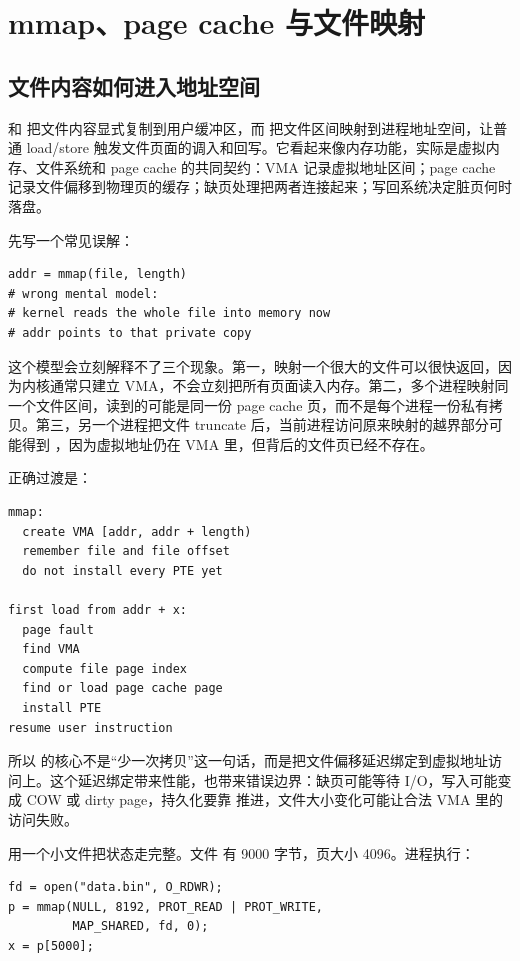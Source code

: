 \chapter{mmap、page cache 与文件映射}

\section{文件内容如何进入地址空间}

 和  把文件内容显式复制到用户缓冲区，而  把文件区间映射到进程地址空间，让普通 load/store 触发文件页面的调入和回写。它看起来像内存功能，实际是虚拟内存、文件系统和 page cache 的共同契约：VMA 记录虚拟地址区间；page cache 记录文件偏移到物理页的缓存；缺页处理把两者连接起来；写回系统决定脏页何时落盘。

先写一个常见误解：

\begin{lstlisting}
addr = mmap(file, length)
# wrong mental model:
# kernel reads the whole file into memory now
# addr points to that private copy
\end{lstlisting}

这个模型会立刻解释不了三个现象。第一，映射一个很大的文件可以很快返回，因为内核通常只建立 VMA，不会立刻把所有页面读入内存。第二，多个进程映射同一个文件区间，读到的可能是同一份 page cache 页，而不是每个进程一份私有拷贝。第三，另一个进程把文件 truncate 后，当前进程访问原来映射的越界部分可能得到 ，因为虚拟地址仍在 VMA 里，但背后的文件页已经不存在。

正确过渡是：

\begin{lstlisting}
mmap:
  create VMA [addr, addr + length)
  remember file and file offset
  do not install every PTE yet

first load from addr + x:
  page fault
  find VMA
  compute file page index
  find or load page cache page
  install PTE
resume user instruction
\end{lstlisting}

所以  的核心不是“少一次拷贝”这一句话，而是把文件偏移延迟绑定到虚拟地址访问上。这个延迟绑定带来性能，也带来错误边界：缺页可能等待 I/O，写入可能变成 COW 或 dirty page，持久化要靠  推进，文件大小变化可能让合法 VMA 里的访问失败。

用一个小文件把状态走完整。文件  有 9000 字节，页大小 4096。进程执行：

\begin{lstlisting}
fd = open("data.bin", O_RDWR);
p = mmap(NULL, 8192, PROT_READ | PROT_WRITE,
         MAP_SHARED, fd, 0);
x = p[5000];
\end{lstlisting}


